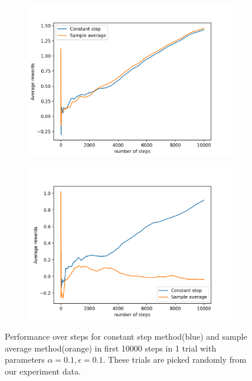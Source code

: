 \documentclass[12pt]{article}
\begin{document}
\begin{figure}
\begin{subfigure}{.5\textwidth}
  \includegraphics[width=1.1\linewidth]{Figure_4.png}
  \caption{}
\end{subfigure}%
\begin{subfigure}{.5\textwidth}
  \centering
  \includegraphics[width=1.1\linewidth]{Figure_5.png}
  \caption{}

\end{subfigure}
\caption{Performance over steps for constant step method(blue) and sample average method(orange) in first 10000 steps in 1 trial with parameters $\alpha = 0.1, \epsilon = 0.1$. These trials are picked randomly from our experiment data.}
\label{fig:fig}
\end{figure}
\end{document}

